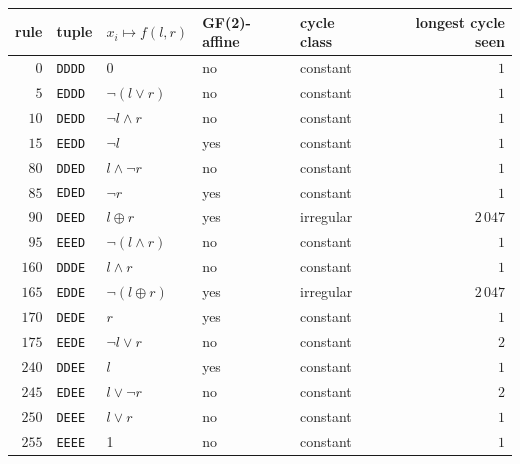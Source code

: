 \begin{tabular}{rllllr}
\hline
rule & tuple & $x_i\mapsto f(l,r)$ & GF(2)-affine & cycle class & longest cycle seen \\
\hline
$0$ & \texttt{DDDD} & 0 & no & constant & $1$ \\
$5$ & \texttt{EDDD} & $\neg(l\vee r)$ & no & constant & $1$ \\
$10$ & \texttt{DEDD} & $\neg l\wedge r$ & no & constant & $1$ \\
$15$ & \texttt{EEDD} & $\neg l$ & yes & constant & $1$ \\
$80$ & \texttt{DDED} & $l\wedge\neg r$ & no & constant & $1$ \\
$85$ & \texttt{EDED} & $\neg r$ & yes & constant & $1$ \\
$90$ & \texttt{DEED} & $l\oplus r$ & yes & irregular & $2\,047$ \\
$95$ & \texttt{EEED} & $\neg(l\wedge r)$ & no & constant & $1$ \\
$160$ & \texttt{DDDE} & $l\wedge r$ & no & constant & $1$ \\
$165$ & \texttt{EDDE} & $\neg(l\oplus r)$ & yes & irregular & $2\,047$ \\
$170$ & \texttt{DEDE} & $r$ & yes & constant & $1$ \\
$175$ & \texttt{EEDE} & $\neg l\vee r$ & no & constant & $2$ \\
$240$ & \texttt{DDEE} & $l$ & yes & constant & $1$ \\
$245$ & \texttt{EDEE} & $l\vee\neg r$ & no & constant & $2$ \\
$250$ & \texttt{DEEE} & $l\vee r$ & no & constant & $1$ \\
$255$ & \texttt{EEEE} & 1 & no & constant & $1$ \\
\hline
\end{tabular}
